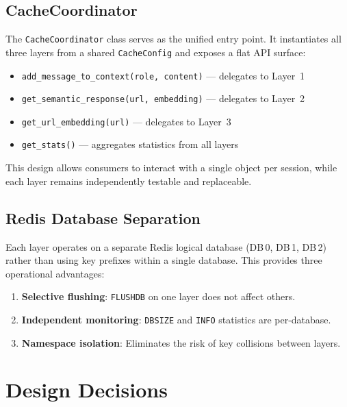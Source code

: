 \documentclass[conference]{IEEEtran}
\begin{document}
\subsection{CacheCoordinator}

The \texttt{CacheCoordinator} class serves as the unified entry point. It instantiates all three layers from a shared \texttt{CacheConfig} and exposes a flat API surface:

\begin{itemize}
\item \texttt{add\_message\_to\_context(role, content)} --- delegates to Layer~1
\item \texttt{get\_semantic\_response(url, embedding)} --- delegates to Layer~2
\item \texttt{get\_url\_embedding(url)} --- delegates to Layer~3
\item \texttt{get\_stats()} --- aggregates statistics from all layers
\end{itemize}

This design allows consumers to interact with a single object per session, while each layer remains independently testable and replaceable.

\subsection{Redis Database Separation}

Each layer operates on a separate Redis logical database (DB\,0, DB\,1, DB\,2) rather than using key prefixes within a single database. This provides three operational advantages:

\begin{enumerate}
\item \textbf{Selective flushing}: \texttt{FLUSHDB} on one layer does not affect others.
\item \textbf{Independent monitoring}: \texttt{DBSIZE} and \texttt{INFO} statistics are per-database.
\item \textbf{Namespace isolation}: Eliminates the risk of key collisions between layers.
\end{enumerate}

\section{Design Decisions}
\label{sec:design}
\end{document}
